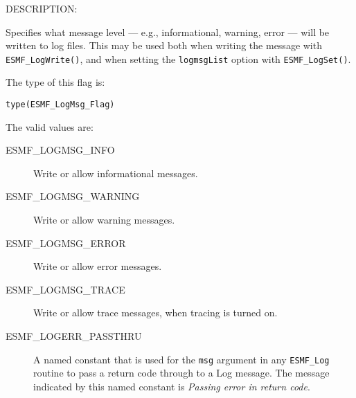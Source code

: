 {\sf DESCRIPTION:\\}
\begin{sloppypar}
Specifies what message level --- e.g., informational, warning, 
error --- will be written to log files.  This may be used both when
writing the message with {\tt ESMF\_LogWrite()}, and when setting the
{\tt logmsgList} option with {\tt ESMF\_LogSet()}.
\end{sloppypar}

The type of this flag is:

{\tt type(ESMF\_LogMsg\_Flag)}

The valid values are:
\begin{description}
   \item [ESMF\_LOGMSG\_INFO] 
         Write or allow informational messages.
   \item [ESMF\_LOGMSG\_WARNING]
         Write or allow warning messages.
   \item [ESMF\_LOGMSG\_ERROR]
         Write or allow error messages.
   \item [ESMF\_LOGMSG\_TRACE]
         Write or allow trace messages, when tracing is turned on.
	\item [ESMF\_LOGERR\_PASSTHRU]
		A named constant that is used for the {\tt msg} argument in any {\tt ESMF\_Log} 
		routine to pass a return code through to a Log message.  The message indicated 
		by this named constant is {\it Passing error in return code}.
\end{description}





